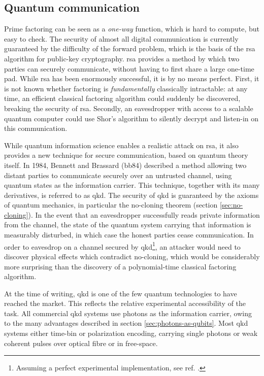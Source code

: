 \subsection{Quantum communication} 
\label{sec:qkd}
Prime factoring can be seen as a \emph{one-way} function, which is hard to compute, but easy to check.  The security of almost all digital communication is currently guaranteed by the difficulty of the forward problem, which is the basis of the \gls{rsa} algorithm for public-key cryptography. \gls{rsa} provides a method by which two parties can securely communicate, without having to first share a large one-time pad. While \gls{rsa} has been enormously successful, it is by no means perfect. First, it is not known whether factoring is \emph{fundamentally} classically intractable: at any time, an efficient classical factoring algorithm could suddenly be discovered, breaking the security of \gls{rsa}. Secondly, an eavesdropper with access to a scalable quantum computer could use Shor's algorithm to silently decrypt and listen-in on this communication.

While quantum information science enables a realistic attack on \gls{rsa}, it also provides a new technique for secure communication, based on quantum theory itself. In 1984, Bennett and Brassard \cite{Bennett1984} (\acrshort{bb84}) described a method allowing two distant parties to communicate securely over an untrusted channel, using quantum states as the information carrier. This technique, together with its many derivatives, is referred to as \gls{qkd}. The security of \gls{qkd} is guaranteed by the axioms of quantum mechanics, in particular the no-cloning theorem (section \ref{sec:no-cloning}). In the event that an eavesdropper successfully reads private information from the channel, the state of the quantum system carrying that information is measurably disturbed, in which case the honest parties cease communication. In order to eavesdrop on a channel secured by \gls{qkd}\footnote{Assuming a perfect experimental implementation, see ref. \cite{Lydersen2010}.}, an attacker would need to discover physical effects which contradict no-cloning, which would be considerably more surprising than the discovery of a polynomial-time classical factoring algorithm.

At the time of writing, \gls{qkd} is one of the few quantum technologies to have reached the market. This reflects the relative experimental accessibility of the task. All commercial \gls{qkd} systems use photons as the information carrier, owing to the many advantages described in section \ref{sec:photons-as-qubits}. Most \gls{qkd} systems either time-bin or polarization encoding, carrying single photons or weak coherent pulses over optical fibre or in free-space. 

